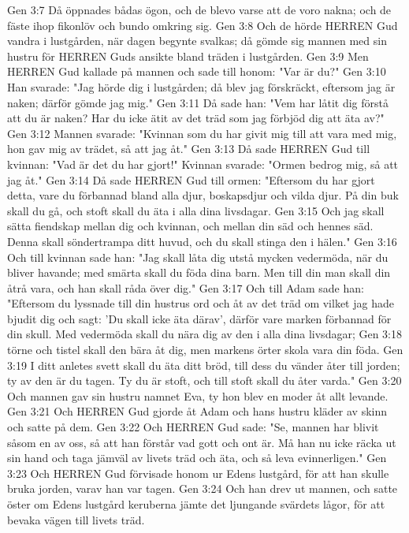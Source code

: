 Gen 3:7  Då öppnades bådas ögon, och de blevo varse att de voro nakna; och de fäste ihop fikonlöv och bundo omkring sig.
Gen 3:8  Och de hörde HERREN Gud vandra i lustgården, när dagen begynte svalkas; då gömde sig mannen med sin hustru för HERREN Guds ansikte bland träden i lustgården.
Gen 3:9  Men HERREN Gud kallade på mannen och sade till honom: "Var är du?"
Gen 3:10  Han svarade: "Jag hörde dig i lustgården; då blev jag förskräckt, eftersom jag är naken; därför gömde jag mig."
Gen 3:11  Då sade han: "Vem har låtit dig förstå att du är naken? Har du icke ätit av det träd som jag förbjöd dig att äta av?"
Gen 3:12  Mannen svarade: "Kvinnan som du har givit mig till att vara med mig, hon gav mig av trädet, så att jag åt."
Gen 3:13  Då sade HERREN Gud till kvinnan: "Vad är det du har gjort!" Kvinnan svarade: "Ormen bedrog mig, så att jag åt."
Gen 3:14  Då sade HERREN Gud till ormen: "Eftersom du har gjort detta, vare du förbannad bland alla djur, boskapsdjur och vilda djur. På din buk skall du gå, och stoft skall du äta i alla dina livsdagar.
Gen 3:15  Och jag skall sätta fiendskap mellan dig och kvinnan, och mellan din säd och hennes säd. Denna skall söndertrampa ditt huvud, och du skall stinga den i hälen."
Gen 3:16  Och till kvinnan sade han: "Jag skall låta dig utstå mycken vedermöda, när du bliver havande; med smärta skall du föda dina barn. Men till din man skall din åtrå vara, och han skall råda över dig."
Gen 3:17  Och till Adam sade han: "Eftersom du lyssnade till din hustrus ord och åt av det träd om vilket jag hade bjudit dig och sagt: 'Du skall icke äta därav', därför vare marken förbannad för din skull. Med vedermöda skall du nära dig av den i alla dina livsdagar;
Gen 3:18  törne och tistel skall den bära åt dig, men markens örter skola vara din föda.
Gen 3:19  I ditt anletes svett skall du äta ditt bröd, till dess du vänder åter till jorden; ty av den är du tagen. Ty du är stoft, och till stoft skall du åter varda."
Gen 3:20  Och mannen gav sin hustru namnet Eva, ty hon blev en moder åt allt levande.
Gen 3:21  Och HERREN Gud gjorde åt Adam och hans hustru kläder av skinn och satte på dem.
Gen 3:22  Och HERREN Gud sade: "Se, mannen har blivit såsom en av oss, så att han förstår vad gott och ont är. Må han nu icke räcka ut sin hand och taga jämväl av livets träd och äta, och så leva evinnerligen."
Gen 3:23  Och HERREN Gud förvisade honom ur Edens lustgård, för att han skulle bruka jorden, varav han var tagen.
Gen 3:24  Och han drev ut mannen, och satte öster om Edens lustgård keruberna jämte det ljungande svärdets lågor, för att bevaka vägen till livets träd.
